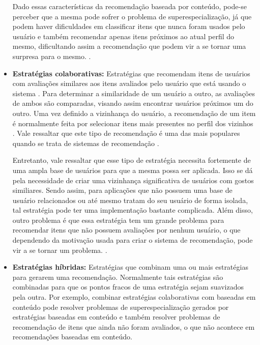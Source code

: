 \begin{itemize}
        Dado essas características da recomendação baseada por conteúdo, pode-se
        perceber que a mesma pode sofrer o problema de superespecialização, já
        que podem haver dificuldades em classificar itens que nunca foram
        usados pelo usuário e também recomendar apenas itens próximos ao atual
        perfil do mesmo, dificultando assim a recomendação que podem vir a se
        tornar uma surpresa para o mesmo. \cite{lops2011content}.

    \item \textbf{Estratégias colaborativas:} Estratégias que recomendam itens
        de usuários com avaliações similares aos itens avaliados pelo usuário
        que está usando o sistema \cite{schafer2007collaborative}.
        Para determinar a similaridade de um usuário a outro, as avaliações de
        ambos são comparadas, visando assim encontrar usuários próximos um do
        outro. Uma vez definido a vizinhança do usuário, a recomendação de um
        item é normalmente feita por selecionar itens mais presentes no perfil
        dos vizinhos \cite{araujo2011apprecommender}. Vale ressaltar que este tipo de recomendação é uma das mais
        populares quando se trata de sistemas de recomendação
        \cite{ricci2011introduction}.

        Entretanto, vale ressaltar que esse tipo de estratégia necessita fortemente
        de uma ampla base de usuários para que a mesma possa ser aplicada. Isso
        se dá pela necessidade de criar uma vizinhança significativa de usuários
        com gostos similiares. Sendo assim, para aplicações que não possuem uma
        base de usuário relacionados ou até mesmo tratam do seu usuário de forma
        isolada, tal estratégia pode ter uma implementação bastante complicada.
        Além disso, outro problema é que essa estratégia tem um
        grande problema para recomendar itens que não possuem avaliações por
        nenhum usuário, o que dependendo da motivação usada para criar o sistema
        de recomendação, pode vir a se tornar um problema.
        \cite{ricci2011introduction}.


    \item \textbf{Estratégias híbridas: } Estratégias que combinam uma ou mais
        estratégias para gerarem uma recomendação. Normalmente tais estratégias
        são combinadas para que os pontos fracos de uma estratégia sejam
        suavizados pela outra. Por exemplo, combinar estratégias colaborativas com
        baseadas em conteúdo pode resolver problemas de superespecialização
        gerados por estratégias baseadas em conteúdo e também resolver problemas
        de recomendação de itens que ainda não foram avaliados, o que não
        acontece em recomendações baseadas em conteúdo.

\end{itemize}


